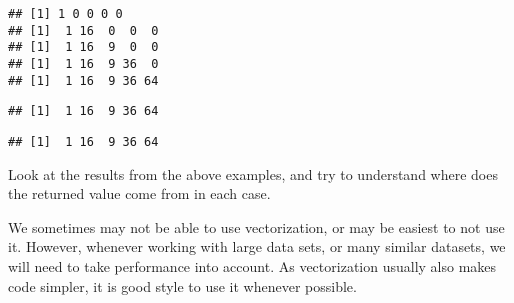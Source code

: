 \documentclass[paper=a4,headsepline,BCOR=12mm,twoside,open=right,%
titlepage,headings=small,fontsize=10pt,index=totoc,bibliography=totoc,%
captions=tableheading,captions=nooneline]{scrbook}\usepackage{knitr}
\begin{document}
\begin{knitrout}
\begin{kframe}
\begin{alltt}
  \hlstd{(}
   \hlkwb{<-} \hlopt{^}
\hlstd{\}}
\end{alltt}
\begin{verbatim}
## [1] 1 0 0 0 0
## [1]  1 16  0  0  0
## [1]  1 16  9  0  0
## [1]  1 16  9 36  0
## [1]  1 16  9 36 64
\end{verbatim}
\begin{alltt}
 
\end{alltt}
\begin{verbatim}
## [1]  1 16  9 36 64
\end{verbatim}
\begin{alltt}
 \hlkwb{<-} \hlopt{^}
\end{alltt}
\begin{verbatim}
## [1]  1 16  9 36 64
\end{verbatim}
\end{kframe}
\end{knitrout}

Look at the results from the above examples, and try to understand where does the returned value come from in each case.

We sometimes may not be able to use vectorization, or may be easiest to not use it. However, whenever working with large data sets, or many similar datasets, we will need to take performance into account. As vectorization usually also makes code simpler, it is good style to use it whenever possible.
\end{document}
